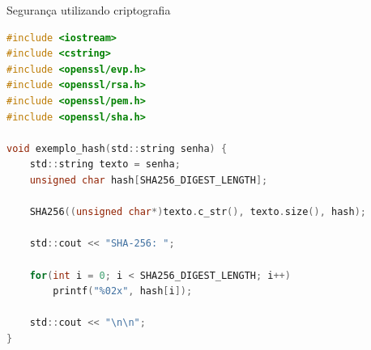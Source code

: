 \begin{frame}[fragile]{Segurança utilizando criptografia}
\begin{lstlisting}[language=C, basicstyle=\tiny]
#include <iostream>
#include <cstring>
#include <openssl/evp.h>
#include <openssl/rsa.h>
#include <openssl/pem.h>
#include <openssl/sha.h>

void exemplo_hash(std::string senha) {
    std::string texto = senha;
    unsigned char hash[SHA256_DIGEST_LENGTH];

    SHA256((unsigned char*)texto.c_str(), texto.size(), hash);

    std::cout << "SHA-256: ";

    for(int i = 0; i < SHA256_DIGEST_LENGTH; i++)
        printf("%02x", hash[i]);
        
    std::cout << "\n\n";
}
\end{lstlisting}
\end{frame}